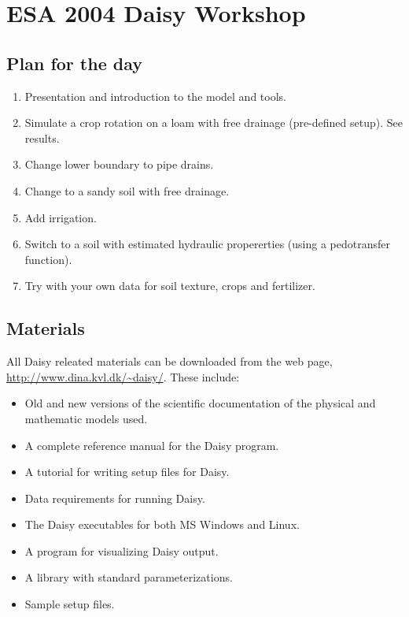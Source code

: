 \documentclass[a4paper,10pt]{article}
\begin{document}
\section*{ESA 2004 Daisy Workshop}

\subsection*{Plan for the day}

\begin{enumerate}
\item Presentation and introduction to the model and tools.
\item Simulate a crop rotation on a loam with free drainage
  (pre-defined setup).  See results.
\item Change lower boundary to pipe drains.
\item Change to a sandy soil with free drainage.
\item Add irrigation.
\item Switch to a soil with estimated hydraulic propererties (using a
  pedotransfer function).
\item Try with your own data for soil texture, crops and fertilizer. 
\end{enumerate}

\subsection*{Materials}

All Daisy releated materials can be downloaded from the web page,
\url{http://www.dina.kvl.dk/~daisy/}.  These include:
\begin{itemize}
\item Old and new versions of the scientific documentation of the
  physical and mathematic models used.
\item A complete reference manual for the Daisy program.
\item A tutorial for writing setup files for Daisy.
\item Data requirements for running Daisy.
\item The Daisy executables for both MS Windows and Linux.  
\item A program for visualizing Daisy output.
\item A library with standard parameterizations.
\item Sample setup files.
\end{itemize}

\nocite{daisy-def,daisy-ems,daisy-fertilizer}

\end{document}
